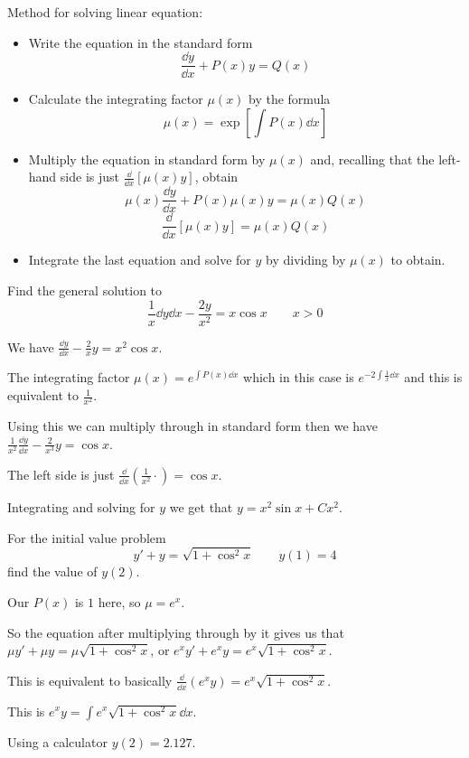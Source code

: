 \documentclass[../diffeq.tex]{subfiles}
\begin{document}
Method for solving linear equation:
\begin{itemize}
    \item Write the equation in the standard form 
    \[ \frac{\dd y}{\dd x}+P(x)y=Q(x) \]
    \item Calculate the integrating factor $\mu(x)$ by the formula 
    \[ \mu(x)=\exp \left[\int P(x)\dd x \right] \]
    \item Multiply the equation in standard form by $\mu(x)$ and, recalling that the left-hand side is just $\frac{\dd}{\dd x}[\mu(x)y]$, obtain 
    \[ \mu(x)\frac{\dd y}{\dd x}+P(x)\mu(x)y=\mu(x)Q(x) \]
    \[ \frac{\dd}{\dd x}[\mu(x)y]=\mu(x)Q(x)\]
    \item Integrate the last equation and solve for $y$ by dividing by $\mu(x)$ to obtain.
\end{itemize}

\begin{example}
    Find the general solution to 
    \[ \frac{1}{x}{\dd y}{\dd x}-\frac{2y}{x^2}=x\cos x \qquad x>0 \]

    We have $\frac{\dd y}{\dd x}-\frac{2}{x}y=x^2\cos x$.

    The integrating factor $\mu(x)=e^{\int P(x)\dd x}$ which in this case is $e^{-2\int \frac{1}{x}\dd x}$ and this is equivalent to $\frac{1}{x^2}$.

    Using this we can multiply through in standard form then we have $\frac{1}{x^2}\frac{\dd y}{\dd x}-\frac{2}{x^3}y=\cos x$.

    The left side is just $\frac{\dd}{\dd x}\left(\frac{1}{x^2}\cdot\right) = \cos x$.

    Integrating and solving for $y$ we get that $y=x^2\sin x+Cx^2$.
\end{example}

\begin{example}
    For the initial value problem 
    \[ y' + y = \sqrt{1+\cos^2 x}\qquad y(1)=4 \]
    find the value of $y(2)$.

    Our $P(x)$ is $1$ here, so $\mu = e^x$.

    So the equation after multiplying through by it gives us that $\mu y' + \mu y = \mu \sqrt{1+\cos^2 x}$, or $e^xy'+e^xy=e^x\sqrt{1+\cos^2 x}$.

    This is equivalent to basically $\frac{\dd}{\dd x}(e^xy)=e^x\sqrt{1+\cos^2 x}$.

    This is $e^x y = \int e^x\sqrt{1+\cos^2 x}\dd x$.

    Using a calculator $y(2)=2.127$.
\end{example}
\end{document}
